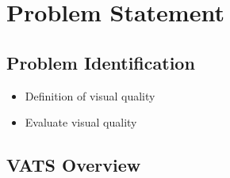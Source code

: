 \section{Problem Statement}

\subsection{Problem Identification}
\begin{itemize}[noitemsep]
  \item Definition of visual quality
  \item Evaluate visual quality 
\end{itemize}

\subsection{VATS Overview}